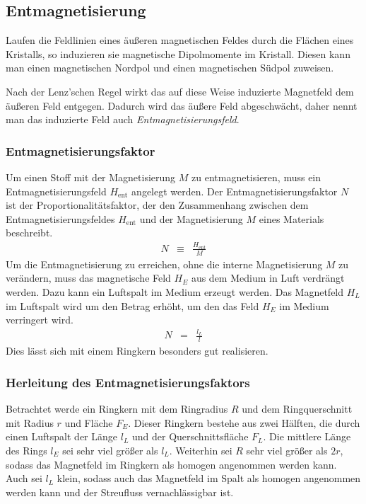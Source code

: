 \documentclass[12pt,a4paper]{scrartcl}
\numberwithin{equation}{section} %
\renewcommand{\[}{} %
\renewcommand{\]}{\noindent} %
\begin{document}
\hypertarget{entmagnetisierung}{%
\subsection{Entmagnetisierung}\label{entmagnetisierung}}

Laufen die Feldlinien eines äußeren magnetischen Feldes durch die Flächen eines Kristalls, so induzieren sie magnetische Dipolmomente im Kristall. Diesen kann man einen magnetischen Nordpol und einen magnetischen Südpol zuweisen.

Nach der Lenz'schen Regel wirkt das auf diese Weise induzierte Magnetfeld dem äußeren Feld entgegen. Dadurch wird das äußere Feld abgeschwächt, daher nennt man das induzierte Feld auch \emph{Entmagnetisierungsfeld}.

\hypertarget{entmagnetisierungsfaktor}{%
\subsubsection{Entmagnetisierungsfaktor}\label{entmagnetisierungsfaktor}}
Um einen Stoff mit der Magnetisierung \(M\) zu entmagnetisieren, muss ein Entmagnetisierungsfeld \(H_\mathrm{ent}\) angelegt werden. Der Entmagnetisierungsfaktor \(N\) ist der Proportionalitätsfaktor, der den Zusammenhang zwischen dem Entmagnetisierungsfeldes \(H_\mathrm{ent}\) und der Magnetisierung \(M\) eines Materials beschreibt.
\begin{eqnarray}
    N &\equiv& \frac{H_\mathrm{ent}}{M} \label{defN}
\end{eqnarray}
Um die Entmagnetisierung zu erreichen, ohne die interne Magnetisierung \(M\) zu verändern, muss das magnetische Feld \(H_E\) aus dem Medium in Luft verdrängt werden. Dazu kann ein Luftspalt im Medium erzeugt werden. Das Magnetfeld \(H_L\) im Luftspalt wird um den Betrag erhöht, um den das Feld \(H_E\) im Medium verringert wird.
\begin{eqnarray}
    N &=& \frac{l_L}{l} \label{N}
\end{eqnarray}
Dies lässt sich mit einem Ringkern besonders gut realisieren.

\hypertarget{herleitung-des-entmagnetisierungsfaktors}{%
\subsubsection{Herleitung des Entmagnetisierungsfaktors}\label{herleitung-des-entmagnetisierungsfaktors}}
Betrachtet werde ein Ringkern mit dem Ringradius \(R\) und dem Ringquerschnitt mit Radius \(r\) und Fläche \(F_E\). Dieser Ringkern bestehe aus zwei Hälften, die durch einen Luftspalt der Länge \(l_L\) und der Querschnittsfläche \(F_L\). Die mittlere Länge des Rings \(l_E\) sei sehr viel größer als \(l_L\). Weiterhin sei \(R\) sehr viel größer als \(2r\), sodass das Magnetfeld im Ringkern als homogen angenommen werden kann. Auch sei \(l_L\) klein, sodass auch das Magnetfeld im Spalt als homogen angenommen werden kann und der Streufluss vernachlässigbar ist.
\end{document}
